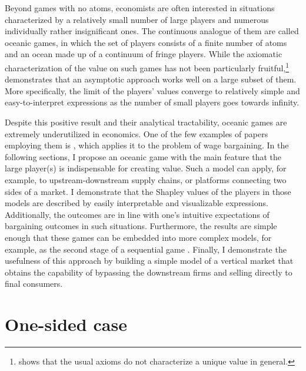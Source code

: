 \documentclass[a4paper]{article}
\begin{document}
Beyond games with no atoms, economists are often interested in situations characterized by a relatively small number of large players and numerous individually rather insignificant ones.
The continuous analogue of them are called oceanic games, in which the set of players consists of a finite number of atoms and an ocean made up of a continuum of fringe players.
While the axiomatic characterization of the value on such games has not been particularly fruitful,\footnote{
    \textcite{hart1973values} shows that the usual axioms do not characterize a unique value in general.
} \textcite{fogelman1980asymptotic} demonstrates that an asymptotic approach works well on a large subset of them.
More specifically, the limit of the players' values converge to relatively simple and easy-to-interpret expressions as the number of small players goes towards infinity.

Despite this positive result and their analytical tractability, oceanic games are extremely underutilized in economics.
One of the few examples of papers employing them is \textcite{levy1997individual}, which applies it to the problem of wage bargaining.
In the following sections, I propose an oceanic game with the main feature that the large player(s) is indispensable for creating value.
Such a model can apply, for example, to upstream-downstream supply chains, or platforms connecting two sides of a market.
I demonstrate that the Shapley values of the players in those models are described by easily interpretable and visualizable expressions.
Additionally, the outcomes are in line with one's intuitive expectations of bargaining outcomes in such situations.
Furthermore, the results are simple enough that these games can be embedded into more complex models, for example, as the second stage of a sequential game \parencite[as in e.g.][]{montez2007downstream}.
Finally, I demonstrate the usefulness of this approach by building a simple model of a vertical market that obtains the capability of bypassing the downstream firms and selling directly to final consumers.


\section{One-sided case}
\end{document}
